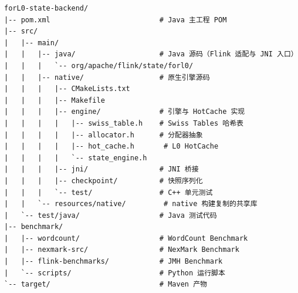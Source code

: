 \documentclass[a4paper,11pt]{article}
\begin{document}
\begin{lstlisting}[language=shellcmd]
forL0-state-backend/
|-- pom.xml                          # Java 主工程 POM
|-- src/
|   |-- main/
|   |   |-- java/                    # Java 源码（Flink 适配与 JNI 入口）
|   |   |   `-- org/apache/flink/state/forl0/
|   |   |-- native/                  # 原生引擎源码
|   |   |   |-- CMakeLists.txt
|   |   |   |-- Makefile
|   |   |   |-- engine/              # 引擎与 HotCache 实现
|   |   |   |   |-- swiss_table.h    # Swiss Tables 哈希表
|   |   |   |   |-- allocator.h      # 分配器抽象
|   |   |   |   |-- hot_cache.h       # L0 HotCache
|   |   |   |   `-- state_engine.h
|   |   |   |-- jni/                 # JNI 桥接
|   |   |   |-- checkpoint/          # 快照序列化
|   |   |   `-- test/                # C++ 单元测试
|   |   `-- resources/native/         # native 构建复制的共享库
|   `-- test/java/                   # Java 测试代码
|-- benchmark/
|   |-- wordcount/                   # WordCount Benchmark
|   |-- nexmark-src/                 # NexMark Benchmark
|   |-- flink-benchmarks/            # JMH Benchmark
|   `-- scripts/                     # Python 运行脚本
`-- target/                          # Maven 产物
\end{lstlisting}
\end{document}
